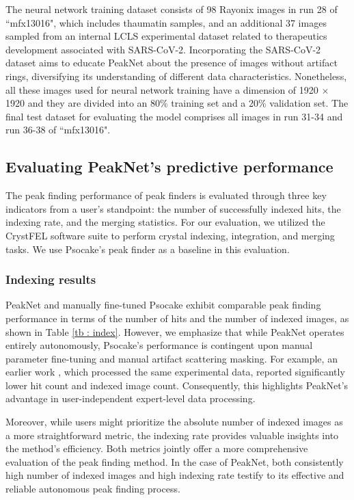\documentclass[a4paper]{article}
\newcommand{\peaknet}{PeakNet}
\newcommand{\psocake}{Psocake}
\begin{document}
The neural network training dataset consists of 98 Rayonix images in run 28 of ``mfx13016", which includes thaumatin samples, and an additional 37 images sampled from an internal LCLS experimental dataset related to therapeutics development associated with SARS-CoV-2.  Incorporating the SARS-CoV-2 dataset aims to educate \peaknet{} about the presence of images without artifact rings, diversifying its understanding of different data characteristics.  Nonetheless, all these images used for neural network training have a dimension of 1920 $\times$ 1920 and they are divided into an 80\% training set and a 20\% validation set.  The final test dataset for evaluating the model comprises all images in run 31-34 and run 36-38 of ``mfx13016".


\subsection{Evaluating \peaknet{}'s predictive performance}

The peak finding performance of peak finders is evaluated through three key indicators from a user's standpoint: the number of successfully indexed hits, the indexing rate, and the merging statistics.  For our evaluation, we utilized the CrystFEL software suite \citep{whiteCrystFELSoftwareSuite2012} to perform crystal indexing, integration, and merging tasks.  We use \psocake{}'s peak finder as a baseline in this evaluation.

\subsubsection{Indexing results}

\peaknet{} and manually fine-tuned \psocake{} exhibit comparable peak finding performance in terms of the number of hits and the number of indexed images, as shown in Table \ref{tb : index}.  However, we emphasize that while \peaknet{} operates entirely autonomously, \psocake{}'s performance is contingent upon manual parameter fine-tuning and manual artifact scattering masking.  For example, an earlier work \citep{suSerialCrystallographyUsing2021}, which processed the same experimental data, reported significantly lower hit count and indexed image count.  Consequently, this highlights \peaknet{}'s advantage in user-independent expert-level data processing.

Moreover, while users might prioritize the absolute number of indexed images as a more straightforward metric, the indexing rate provides valuable insights into the method's efficiency.  Both metrics jointly offer a more comprehensive evaluation of the peak finding method. In the case of \peaknet{}, both consistently high number of indexed images and high indexing rate testify to its effective and reliable autonomous peak finding process.
\end{document}
